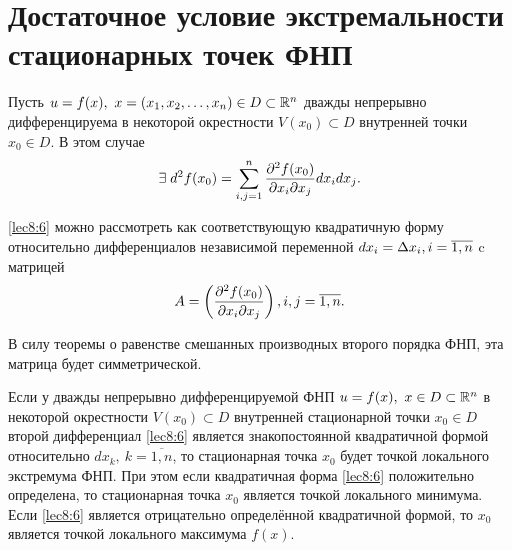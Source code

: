 \documentclass[../../main.tex]{subfiles}
\begin{document}
    \section{Достаточное условие экстремальности стационарных точек ФНП}
    Пусть $u = f(x),\ x = (x_1, x_2, \ldots, x_n) \in D \subset \mathbb{R}^n$
    дважды непрерывно дифференцируема в некоторой окрестности $V(x_0) \subset 
    D$
    внутренней точки $x_0 \in D$. В этом случае
    \begin{equation}
        \exists \; d^2f(x_0) = \sum_{i, j = 1}^n\frac{\partial ^2f(x_0)}{\partial x_i
        \partial x_j}dx_idx_j.
        \label{lec8:6}
    \end{equation}

    \eqref{lec8:6} можно рассмотреть как соответствующую квадратичную
    форму относительно дифференциалов независимой переменной $dx_i = \Delta x_i,
    i = \overline{1, n}$ c матрицей
    \[A = \left(\frac{\partial ^2f(x_0)}{\partial x_i\partial x_j}\right), i,j =
    \overline{1,n}. \]

    В силу теоремы о равенстве смешанных производных второго порядка ФНП,
    эта матрица будет симметрической.

    \begin{thm}
        Если у дважды непрерывно дифференцируемой ФНП $u=f(x),\ x \in D 
        \subset \mathbb{R}^n$
        в некоторой окрестности $V(x_0) \subset D$ внутренней стационарной
        точки $x_0 \in D$ второй дифференциал \eqref{lec8:6} является
        знакопостоянной квадратичной формой относительно $dx_k,\ k =
        \overline{1, n}$, то стационарная точка $x_0$ будет точкой локального
        экстремума ФНП. При этом если квадратичная форма \eqref{lec8:6}
        положительно определена, то стационарная точка $x_0$ является точкой
        локального минимума. Если \eqref{lec8:6} является отрицательно
        определённой квадратичной формой, то $x_0$ является точкой локального
        максимума $f(x)$.
    \end{thm}
\end{document}
